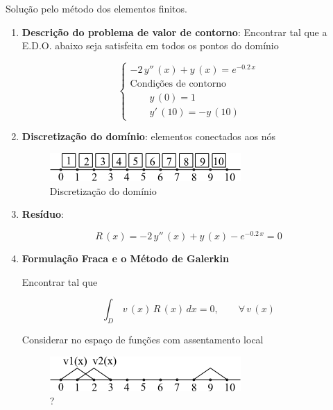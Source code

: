 \begin{example}

Solução pelo método dos elementos finitos.

\begin{enumerate}

\item \textbf{Descrição do problema de valor de contorno}: Encontrar  tal que a E.D.O. abaixo seja satisfeita em todos os pontos do domínio 

\[
 \left\{
 \begin{array}{l}
  -2 \, y''\,(x) + y\,(x) = e^{-0.2\,x} \\
  \mbox{Condições de contorno} \\
  \qquad y\,(0) = 1 \\
  \qquad y'\,(10) = -y\,(10)
 \end{array}
 \right.
\]

\item \textbf{Discretização do domínio}:  elementos conectados aos  nós

\begin{figure}[htb]
 \centering
 \includegraphics[scale=1.0]{capitulos/capitulo7/figuras/algo_sol_sist_tri2.png}
 \caption{Discretização do domínio}
 \label{fig:algo_sol_sist_tri2}
\end{figure}

\item \textbf{Resíduo}:

\[
 R\,(x) = -2 \, y''\,(x) + y\,(x) - e^{-0.2\,x} = 0
\]

\item \textbf{Formulação Fraca e o Método de Galerkin}

Encontrar  tal que

\begin{equation}
 \label{cap7:sec2:eq1}
 \int_D \, v\,(x) \, R\,(x) \, dx = 0, \qquad \forall \, v\,(x)
\end{equation}

Considerar  no espaço de funções com assentamento local

\begin{figure}[htb]
 \centering
 \includegraphics[scale=1.0]{capitulos/capitulo7/figuras/algo_sol_sist_tri3.png}
 \caption{?}
 \label{fig:algo_sol_sist_tri3}
\end{figure}


\end{enumerate}
\end{example}
